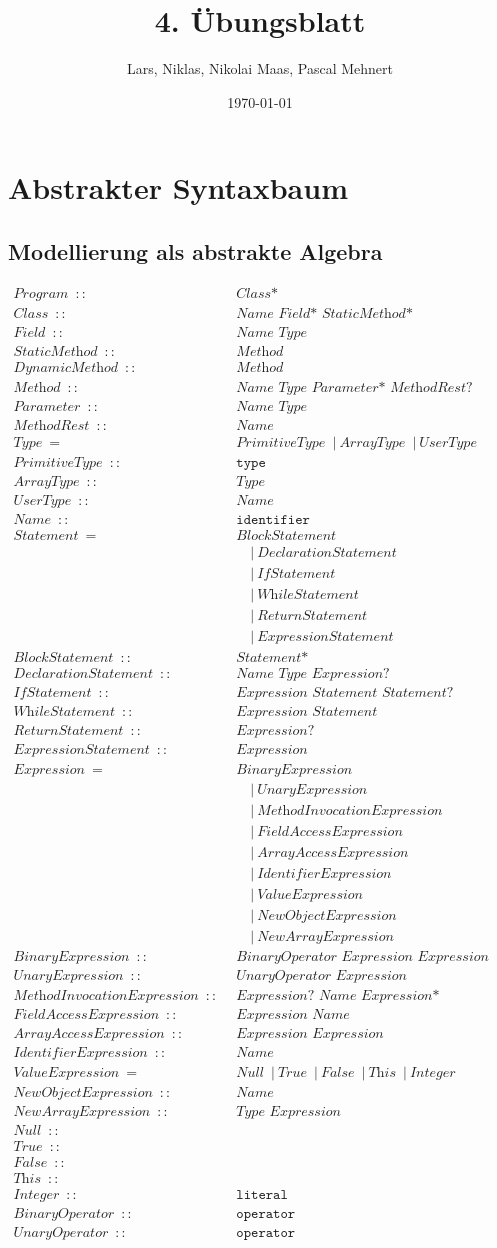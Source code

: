 \documentclass[12pt,a4paper]{scrartcl}
\title{4. Übungsblatt}
\author{Lars, Niklas, Nikolai Maas, Pascal Mehnert}
\date{\today}
\newcommand{\node}[2]{\textit{#1} \enspace::\enspace &\textit{#2}\\}
\newcommand{\leaf}[2]{\textit{#1} \enspace::\enspace &\texttt{#2}\\}
\newcommand{\kind}[2]{\textit{#1} \enspace=\enspace &\textit{#2}\\}
\renewcommand{\bar}[1]{&\quad | \:\textit{#1}\\}
\newcommand{\kindol}[2]{\textit{#1} \enspace=\enspace &\textit{#2}}
\newcommand{\barol}[1]{\enspace | \:\textit{#1}}
\begin{document}
\allowdisplaybreaks
\def\tor{\textnormal{|}}

\maketitle

\section{Abstrakter Syntaxbaum}

\subsection{Modellierung als abstrakte Algebra}

\begin{align*}
    \node{Program}{Class*}
    \node{Class}{Name Field* StaticMethod* DynamicMethod*}
    \node{Field}{Name Type}
    \node{StaticMethod}{Method}
    \node{DynamicMethod}{Method}
    \node{Method}{Name Type Parameter* MethodRest? Statement+}
    \node{Parameter}{Name Type}
    \node{MethodRest}{Name}
    \kindol{Type}{PrimitiveType}
        \barol{ArrayType}
        \barol{UserType}\\
    \leaf{PrimitiveType}{type}
    \node{ArrayType}{Type}
    \node{UserType}{Name}
    \leaf{Name}{identifier}
    \kind{Statement}{BlockStatement}
        \bar{DeclarationStatement}
        \bar{IfStatement}
        \bar{WhileStatement}
        \bar{ReturnStatement}
        \bar{ExpressionStatement}
    \node{BlockStatement}{Statement*}
    \node{DeclarationStatement}{Name Type Expression?}
    \node{IfStatement}{Expression Statement Statement?}
    \node{WhileStatement}{Expression Statement}
    \node{ReturnStatement}{Expression?}
    \node{ExpressionStatement}{Expression}
    \kind{Expression}{BinaryExpression}
        \bar{UnaryExpression}
        \bar{MethodInvocationExpression}
        \bar{FieldAccessExpression}
        \bar{ArrayAccessExpression}
        \bar{IdentifierExpression}
        \bar{ValueExpression}
        \bar{NewObjectExpression}
        \bar{NewArrayExpression}
    \node{BinaryExpression}{BinaryOperator Expression Expression}
    \node{UnaryExpression}{UnaryOperator Expression}
    \node{MethodInvocationExpression}{Expression? Name Expression*}
    \node{FieldAccessExpression}{Expression Name}
    \node{ArrayAccessExpression}{Expression Expression}
    \node{IdentifierExpression}{Name}
    \kindol{ValueExpression}{Null}
        \barol{True}
        \barol{False}
        \barol{This}
        \barol{Integer}\\
    \node{NewObjectExpression}{Name}
    \node{NewArrayExpression}{Type Expression}
    \leaf{Null}{}
    \leaf{True}{}
    \leaf{False}{}
    \leaf{This}{}
    \leaf{Integer}{literal}
    \leaf{BinaryOperator}{operator}
    \leaf{UnaryOperator}{operator}
\end{align*}
\end{document}
